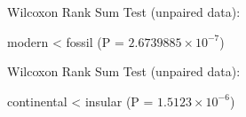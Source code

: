 \begin{center}
	\begin{figure}[H]
		\label{fig:boxFMCI}
	\end{figure}
\end{center}

Wilcoxon Rank Sum Test (unpaired data):

modern \textless{} fossil (P = \(2.6739885\times 10^{-7}\))


Wilcoxon Rank Sum Test (unpaired data):

continental \textless{} insular (P = \(1.5123\times 10^{-6}\))



